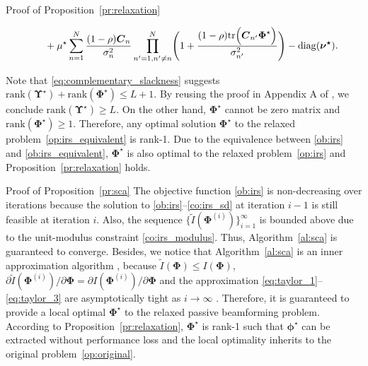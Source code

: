\documentclass[journal]{IEEEtran}
\begin{document}
\begin{appendix}
\begin{subsection}{Proof of Proposition~\ref{pr:relaxation}}
\begin{figure*}[!b]
\begin{align}
					& \quad + \mu^\star \sum_{n=1}^N \frac{(1-\rho) \boldsymbol{C}_n}{\sigma_n^2} \prod_{n'=1,n' \ne n}^N \Biggl(
						1 + \frac{(1-\rho)\mathrm{tr}\Bigl(
							\boldsymbol{C}_{n'} \boldsymbol{\Phi}^\star
						\Bigr)}{\sigma_{n'}^2}
					\Biggr) - \mathrm{diag}(\boldsymbol{\nu^\star}).
				\end{align}
			\end{figure*}
			Note that \eqref{eq:complementary_slackness} suggests $\mathrm{rank}(\boldsymbol{\Upsilon}^\star)+\mathrm{rank}(\boldsymbol{\Phi}^\star) \le L+1$. By reusing the proof in Appendix A of \cite{Xu2020}, we conclude $\mathrm{rank}(\boldsymbol{\Upsilon}^\star) \ge L$. On the other hand, $\boldsymbol{\Phi}^\star$ cannot be zero matrix and $\mathrm{rank}(\boldsymbol{\Phi}^\star) \ge 1$. Therefore, any optimal solution $\boldsymbol{\Phi}^\star$ to the relaxed problem~\eqref{op:irs_equivalent} is rank-\num{1}. Due to the equivalence between \eqref{ob:irs} and \eqref{ob:irs_equivalent}, $\boldsymbol{\Phi}^\star$ is also optimal to the relaxed problem~\eqref{op:irs} and Proposition~\ref{pr:relaxation} holds.
		\end{subsection}

		\begin{subsection}{Proof of Proposition~\ref{pr:sca}}\label{ap:sca}
			The objective function \eqref{ob:irs} is non-decreasing over iterations because the solution to \eqref{ob:irs}--\eqref{co:irs_sd} at iteration $i-1$ is still feasible at iteration $i$. Also, the sequence $\{\tilde{I}(\boldsymbol{\Phi}^{(i)})\}_{i=1}^{\infty}$ is bounded above due to the unit-modulus constraint \eqref{co:irs_modulus}. Thus, Algorithm~\ref{al:sca} is guaranteed to converge. Besides, we notice that Algorithm~\ref{al:sca} is an inner approximation algorithm \cite{Marks1978}, because $\tilde{I}(\boldsymbol{\Phi}) \le I(\boldsymbol{\Phi})$, $\partial\tilde{I}(\boldsymbol{\Phi}^{(i)})/\partial\boldsymbol{\Phi}=\partial I(\boldsymbol{\Phi}^{(i)})/\partial\boldsymbol{\Phi}$ and the approximation \eqref{eq:taylor_1}--\eqref{eq:taylor_3} are asymptotically tight as $i \to \infty$ \cite{Li2013}. Therefore, it is guaranteed to provide a local optimal $\boldsymbol{\Phi}^{\star}$ to the relaxed passive beamforming problem. According to Proposition~\ref{pr:relaxation}, $\boldsymbol{\Phi}^{\star}$ is rank-\num{1} such that $\boldsymbol{\phi}^{\star}$ can be extracted without performance loss and the local optimality inherits to the original problem~\eqref{op:original}.
		\end{subsection}


\end{appendix}
\end{document}

